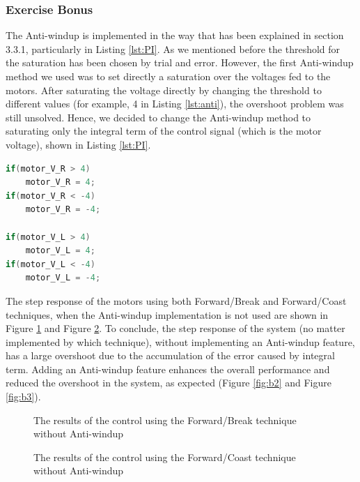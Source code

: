 \documentclass[english]{article}
\begin{document}
\subsubsection{Exercise Bonus}
The Anti-windup is implemented in the way that has been explained in
section 3.3.1, particularly in Listing \ref{lst:PI}. As we mentioned before the
threshold for the saturation has been chosen by trial and error. 
However, the first Anti-windup method we used was to set directly a 
saturation over the voltages fed to the motors. After saturating the
voltage directly by changing the threshold to different values 
(for example, 4 in Listing \ref{lst:anti}), the overshoot problem was still unsolved. 
Hence, we decided to change the Anti-windup method to saturating only the
 integral term of the control signal (which is the motor voltage), shown 
 in Listing \ref{lst:PI}. 
\begin{lstlisting}[language=C, caption={wrong Anti-windup method}, label={lst:anti} ]
if(motor_V_R > 4)
    motor_V_R = 4;
if(motor_V_R < -4)
    motor_V_R = -4;

if(motor_V_L > 4)
    motor_V_L = 4;
if(motor_V_L < -4)
    motor_V_L = -4;
\end{lstlisting}
The step response of the motors using both Forward/Break and
Forward/Coast techniques, when the Anti-windup implementation
is not used are shown in Figure \ref{fig:b4} and Figure \ref{fig:b5}. To conclude, 
the step response of the system (no matter implemented by which technique),
 without implementing an Anti-windup feature, has a large overshoot due
  to the accumulation of the error caused by integral term. Adding an 
  Anti-windup feature enhances the overall performance and reduced the 
  overshoot in the system, as expected (Figure \ref{fig:b2} and Figure \ref{fig:b3}).
\begin{figure}[tbh]
    \centering
    
    \caption{The results of the control using the Forward/Break technique without Anti-windup} 
    \label{fig:b4}
\end{figure} 
\newpage
\begin{figure}[tbh]
    \centering
    
    \caption{The results of the control using the Forward/Coast technique without Anti-windup} 
    \label{fig:b5}
\end{figure} 

\newpage
\end{document}
